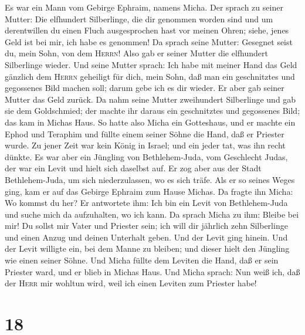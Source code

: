  Es war ein Mann vom Gebirge Ephraim, namens Micha. Der
sprach zu seiner Mutter:  Die elfhundert Silberlinge, die
dir genommen worden sind und um derentwillen du einen Fluch
ausgesprochen hast vor meinen Ohren; siehe, jenes Geld ist bei mir, ich
habe es genommen! Da sprach seine Mutter: Gesegnet seist du, mein Sohn,
von dem \textsc{Herrn}!  Also gab er seiner Mutter die
elfhundert Silberlinge wieder. Und seine Mutter sprach: Ich habe mit
meiner Hand das Geld gänzlich dem \textsc{Herrn} geheiligt für dich,
mein Sohn, daß man ein geschnitztes und gegossenes Bild machen soll;
darum gebe ich es dir wieder.  Er aber gab seiner Mutter
das Geld zurück. Da nahm seine Mutter zweihundert Silberlinge und gab
sie dem Goldschmied; der machte ihr daraus ein geschnitztes und
gegossenes Bild; das kam in Michas Haus.  So hatte also
Micha ein Gotteshaus, und er machte ein Ephod und Teraphim und füllte
einem seiner Söhne die Hand, daß er Priester wurde.  Zu
jener Zeit war kein König in Israel; und ein jeder tat, was ihn recht
dünkte.  Es war aber ein Jüngling von Bethlehem-Juda, vom
Geschlecht Judas, der war ein Levit und hielt sich daselbst auf.
 Er zog aber aus der Stadt Bethlehem-Juda, um sich
niederzulassen, wo es sich träfe. Als er so seines Weges ging, kam er
auf das Gebirge Ephraim zum Hause Michas.  Da fragte ihn
Micha: Wo kommst du her? Er antwortete ihm: Ich bin ein Levit von
Bethlehem-Juda und suche mich da aufzuhalten, wo ich kann.
 Da sprach Micha zu ihm: Bleibe bei mir! Du sollst mir
Vater und Priester sein; ich will dir jährlich zehn Silberlinge und
einen Anzug und deinen Unterhalt geben. Und der Levit ging hinein.
 Und der Levit willigte ein, bei dem Manne zu bleiben;
und dieser hielt den Jüngling wie einen seiner Söhne. 
Und Micha füllte dem Leviten die Hand, daß er sein Priester ward, und er
blieb in Michas Haus.  Und Micha sprach: Nun weiß ich,
daß der \textsc{Herr} mir wohltun wird, weil ich einen Leviten zum
Priester habe!

\hypertarget{section-17}{%
\section{18}\label{section-17}}

